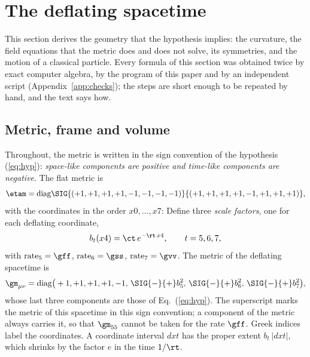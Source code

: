 \section{The deflating spacetime}
\label{sec:geometry}

This section derives the geometry that the hypothesis implies: the curvature, the field equations
that the metric does and does not solve, its symmetries, and the motion of a classical particle.
Every formula of this section was obtained twice by exact computer algebra, by the program of this
paper and by an independent script (Appendix~\ref{app:checks}); the steps are short enough to be
repeated by hand, and the text says how.

\subsection{Metric, frame and volume}

Throughout, the metric is written in the sign convention of the hypothesis (\ref{eq:hyp}):
\emph{space-like components are positive and time-like components are negative}. The flat metric is
\begin{equation}
\etam=\mathrm{diag}\SIG{(+1,+1,+1,+1,-1,-1,-1,-1)}{(+1,+1,+1,+1,-1,+1,+1,+1)},
\label{eq:etam}
\end{equation}
with the coordinates in the order $x0,\dots,x7$:  Define three \emph{scale factors}, one for each deflating coordinate,
\begin{equation}
b_t(x4)=\ct\,e^{-\rt\,x4},\qquad t=5,6,7,
\label{eq:scale}
\end{equation}
with $\mathrm{rate}_5=\gff$, $\mathrm{rate}_6=\gss$, $\mathrm{rate}_7=\gvv$. The metric of the
deflating spacetime is
\begin{equation}
\gm_{\mu\nu}=\mathrm{diag}\big(+1,+1,+1,+1,-1,\,\SIG{-}{+}b_5^2,\,\SIG{-}{+}b_6^2,\,\SIG{-}{+}b_7^2\big),
\label{eq:metric}
\end{equation}
whose last three components are those of Eq.~(\ref{eq:hyp}). The superscript 
marks the metric of this spacetime in this sign convention; a component of the metric always
carries it, so that $\gm_{55}$ cannot be taken for the rate $\gff$. Greek indices label the
coordinates. A
coordinate interval $dxt$ has the proper extent $b_t\,|dxt|$, which shrinks by the factor $e$ in the
time $1/\rt$. 

